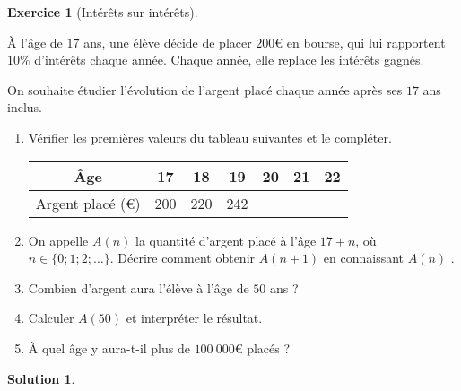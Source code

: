 \documentclass[12pt]{paper}
\theoremstyle{plain}
\newtheorem*{sol}{Solution}
\theoremstyle{definition}
\newtheorem{ex}{Exercice}
\newcommand{\exe}[2]{
		\begin{ex} #1  \end{ex}
		\begin{sol} #2 \end{sol}
	}
\newcommand{\exe}[2]{
		\begin{ex} #1  \end{ex}
	}
\begin{document}
\exe{[Intérêts sur intérêts]\label{ex:2}

	À l'âge de $17$ ans, une élève décide de placer $200$€ en bourse, qui lui rapportent $10\%$ d'intérêts chaque année.
	Chaque année, elle replace les intérêts gagnés.
	
	On souhaite étudier l'évolution de l'argent placé chaque année après ses $17$ ans inclus.
	\begin{enumerate}
		\item Vérifier les premières valeurs du tableau suivantes et le compléter.
			\begin{center}
			\begin{tabular}{|c|c|c|c|c|c|c|}\hline
				Âge & 17 & 18 & 19 & 20 & 21 & 22 \\ \hline
				Argent placé (€) & 200 & 220 & 242 & & &  \\ \hline
			\end{tabular}
			\end{center}
		\item On appelle $A(n)$ la quantité d'argent placé à l'âge $17+n$, où $n\in \{0 ; 1 ; 2; \dots \}$.
		Décrire comment obtenir $A(n+1)$ en connaissant $A(n)$
		.%
		
		\item Combien d'argent aura l'élève à l'âge de $50$ ans ? 
		\item Calculer $A(50)$ et interpréter le résultat.
		\item À quel âge y aura-t-il plus de $100 \  000$€ placés ?		
	\end{enumerate}
 }{}
 
\end{document}
